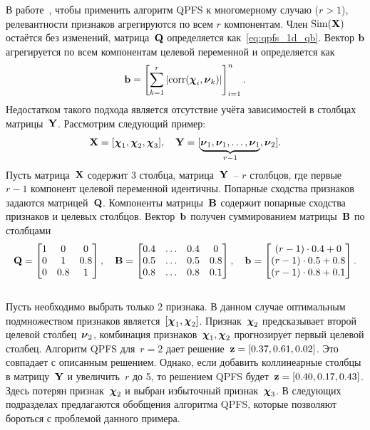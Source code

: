 В работе~\cite{motrenko2018multi}, чтобы применить алгоритм QPFS к многомерному случаю ($r > 1$), релевантности признаков агрегируются по всем $r$ компонентам. Член $\text{Sim}(\mathbf{X})$ остаётся без изменений, матрица~$\mathbf{Q}$ определяется как~\eqref{eq:qpfs_1d_qb}. Вектор $\mathbf{b}$ агрегируется по всем компонентам целевой переменной и определяется как
\begin{equation*}
\mathbf{b} = \left[\sum_{k=1}^r|\text{corr}(\boldsymbol{\chi}_i, \boldsymbol{\nu}_k)|\right]_{i=1}^n.
\end{equation*}
Недостатком такого подхода является отсутствие учёта зависимостей в столбцах матрицы~$\mathbf{Y}$. Рассмотрим следующий пример:
\begin{equation*}
\mathbf{X} = [\boldsymbol{\chi}_1, \boldsymbol{\chi}_2, \boldsymbol{\chi}_3], \quad \mathbf{Y} = [\underbrace{\boldsymbol{\nu}_1, \boldsymbol{\nu}_1, \dots, \boldsymbol{\nu}_1}_{r-1}, \boldsymbol{\nu}_2].
\end{equation*}
Пусть матрица~$\mathbf{X}$ содержит 3 столбца, матрица~$\mathbf{Y}$~-- $r$ столбцов, где первые $r-1$ компонент целевой переменной идентичны.
Попарные сходства признаков задаются матрицей~$\mathbf{Q}$.
Компоненты матрицы~$\mathbf{B}$ содержит попарные сходства признаков и целевых столбцов.
Вектор~$\mathbf{b}$ получен суммированием матрицы~$\mathbf{B}$ по столбцами
\begin{equation}
\mathbf{Q} = \begin{bmatrix} 1 & 0 & 0\\ 0 & 1 & 0.8 \\ 0 & 0.8 & 1 \end{bmatrix}, \quad
\mathbf{B} = \begin{bmatrix} 0.4 & \dots & 0.4 & 0 \\ 0.5 & \dots & 0.5 & 0.8 \\ 0.8 & \dots & 0.8 & 0.1 \end{bmatrix}, \quad
\mathbf{b} = \begin{bmatrix} (r-1) \cdot 0.4 + 0 \\ (r-1) \cdot 0.5 + 0.8 \\ (r-1) \cdot 0.8 + 0.1 \end{bmatrix}.
\label{eq:qpfs_example}
\end{equation}
\vspace{0.5cm} \\
Пусть необходимо выбрать только 2 признака.
В данном случае оптимальным подмножеством признаков является~$[\boldsymbol{\chi}_1, \boldsymbol{\chi}_2]$.
Признак~$\boldsymbol{\chi}_2$ предсказывает второй целевой столбец~$\boldsymbol{\nu}_2$, комбинация признаков~$\boldsymbol{\chi}_1, \boldsymbol{\chi}_2$ прогнозирует первый целевой столбец.
Алгоритм QPFS для~$r=2$ дает решение~$\mathbf{z} = [0.37, 0.61, 0.02]$. Это совпадает с описанным решением.
Однако, если добавить коллинеарные столбцы в матрицу~$\mathbf{Y}$ и увеличить~$r$ до 5, то решением QPFS будет~$\mathbf{z} = [0.40, 0.17, 0.43]$.
Здесь потерян признак~$\boldsymbol{\chi}_2$ и выбран избыточный признак~$\boldsymbol{\chi}_3$.
В следующих подразделах предлагаются обобщения алгоритма QPFS, которые позволяют бороться с проблемой данного примера.

